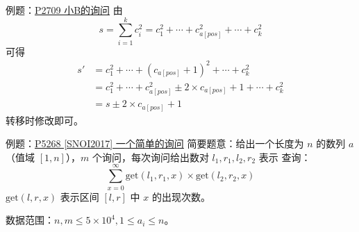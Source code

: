 \documentclass[table]{beamer}
\begin{document}
\begin{frame}{例题：{\color{blue}\href{https://www.luogu.com.cn/problem/P2709}{P2709 小B的询问}}}
	由
	$$
	s=\sum\limits_{i=1}^k c_i^2=c_1^2+\cdots+c_{a[pos]}^2+\cdots+c_k^2
	$$
	可得
	$$
	\begin{aligned}
		s'&=c_1^2+\cdots+(c_{a[pos]}+1)^2+\cdots+c_k^2\\
		&=c_1^2+\cdots+c_{a[pos]}^2\pm2\times c_{a[pos]}+1+\cdots+c_k^2\\
		&=s\pm2\times c_{a[pos]}+1
	\end{aligned}
	$$
	转移时修改即可。
\end{frame}

\begin{frame}{例题：{\color{blue}\href{https://www.luogu.com.cn/problem/P5268}{P5268 [SNOI2017] 一个简单的询问}}}
	简要题意：给出一个长度为 $n$ 的数列 $a$（值域 $[1,n]$），$m$ 个询问，每次询问给出数对 $l_1,r_1,l_2,r_2$ 表示
	查询：
	$$
	\sum\limits_{x=0}^\infty \text{get}(l_1,r_1,x)\times \text{get}(l_2,r_2,x)
	$$
	$\text{get}(l,r,x)$ 表示区间 $[l,r]$ 中 $x$ 的出现次数。

	数据范围：$n,m\le 5\times 10^4,1\le a_i\le n$。
\end{frame}
\end{document}
